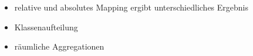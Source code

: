 \begin{itemize}
	\item relative und absolutes Mapping ergibt unterschiedliches Ergebnis
	\item Klassenaufteilung
	\item räumliche Aggregationen
\end{itemize}